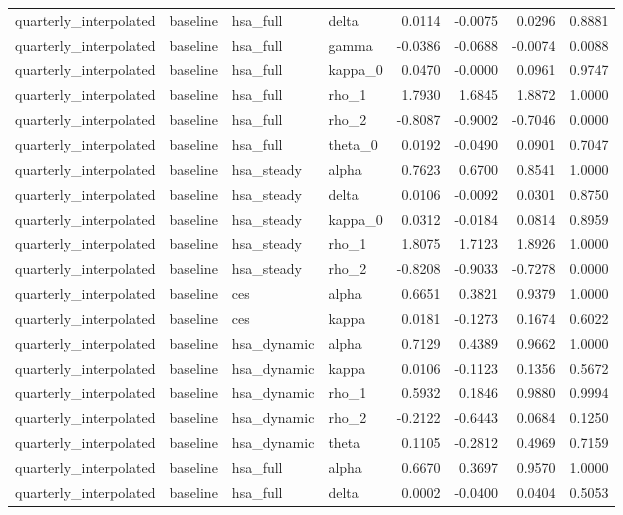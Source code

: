 \begin{tabular}{llllrrrr}
quarterly\_interpolated & baseline & hsa\_full & delta & 0.0114 & -0.0075 & 0.0296 & 0.8881 \\
quarterly\_interpolated & baseline & hsa\_full & gamma & -0.0386 & -0.0688 & -0.0074 & 0.0088 \\
quarterly\_interpolated & baseline & hsa\_full & kappa\_0 & 0.0470 & -0.0000 & 0.0961 & 0.9747 \\
quarterly\_interpolated & baseline & hsa\_full & rho\_1 & 1.7930 & 1.6845 & 1.8872 & 1.0000 \\
quarterly\_interpolated & baseline & hsa\_full & rho\_2 & -0.8087 & -0.9002 & -0.7046 & 0.0000 \\
quarterly\_interpolated & baseline & hsa\_full & theta\_0 & 0.0192 & -0.0490 & 0.0901 & 0.7047 \\
quarterly\_interpolated & baseline & hsa\_steady & alpha & 0.7623 & 0.6700 & 0.8541 & 1.0000 \\
quarterly\_interpolated & baseline & hsa\_steady & delta & 0.0106 & -0.0092 & 0.0301 & 0.8750 \\
quarterly\_interpolated & baseline & hsa\_steady & kappa\_0 & 0.0312 & -0.0184 & 0.0814 & 0.8959 \\
quarterly\_interpolated & baseline & hsa\_steady & rho\_1 & 1.8075 & 1.7123 & 1.8926 & 1.0000 \\
quarterly\_interpolated & baseline & hsa\_steady & rho\_2 & -0.8208 & -0.9033 & -0.7278 & 0.0000 \\
quarterly\_interpolated & baseline & ces & alpha & 0.6651 & 0.3821 & 0.9379 & 1.0000 \\
quarterly\_interpolated & baseline & ces & kappa & 0.0181 & -0.1273 & 0.1674 & 0.6022 \\
quarterly\_interpolated & baseline & hsa\_dynamic & alpha & 0.7129 & 0.4389 & 0.9662 & 1.0000 \\
quarterly\_interpolated & baseline & hsa\_dynamic & kappa & 0.0106 & -0.1123 & 0.1356 & 0.5672 \\
quarterly\_interpolated & baseline & hsa\_dynamic & rho\_1 & 0.5932 & 0.1846 & 0.9880 & 0.9994 \\
quarterly\_interpolated & baseline & hsa\_dynamic & rho\_2 & -0.2122 & -0.6443 & 0.0684 & 0.1250 \\
quarterly\_interpolated & baseline & hsa\_dynamic & theta & 0.1105 & -0.2812 & 0.4969 & 0.7159 \\
quarterly\_interpolated & baseline & hsa\_full & alpha & 0.6670 & 0.3697 & 0.9570 & 1.0000 \\
quarterly\_interpolated & baseline & hsa\_full & delta & 0.0002 & -0.0400 & 0.0404 & 0.5053 \\

\end{tabular}
